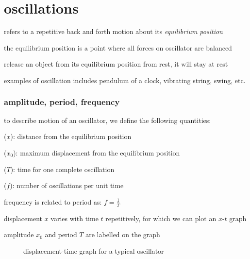 
\chapter{oscillations}
\begin{ilight}
	 refers to a repetitive back and forth motion about its \emph{equilibrium position}
\end{ilight}

the equilibrium position is a point where all forces on oscillator are balanced

release an object from its equilibrium position from rest, it will stay at rest

examples of oscillation includes pendulum of a clock, vibrating string, swing, etc.


\subsection{amplitude, period, frequency}

to describe motion of an oscillator, we define the following quantities:

\cmt {} ($x$): distance from the equilibrium position

\cmt {} ($x_0$): maximum displacement from the equilibrium position

\cmt {} ($T$): time for one complete oscillation

\cmt {} ($f$): number of oscillations per unit time

frequency is related to period as: $\boxed{f=\frac{1}{T}}$

\vspace*{\baselineskip}

displacement $x$ varies with time $t$ repetitively, for which we can plot an $x$-$t$ graph

amplitude $x_0$ and period $T$ are labelled on the graph


\begin{figure}[ht]
\centering
{}

\caption*{displacement-time graph for a typical oscillator}
\end{figure}


